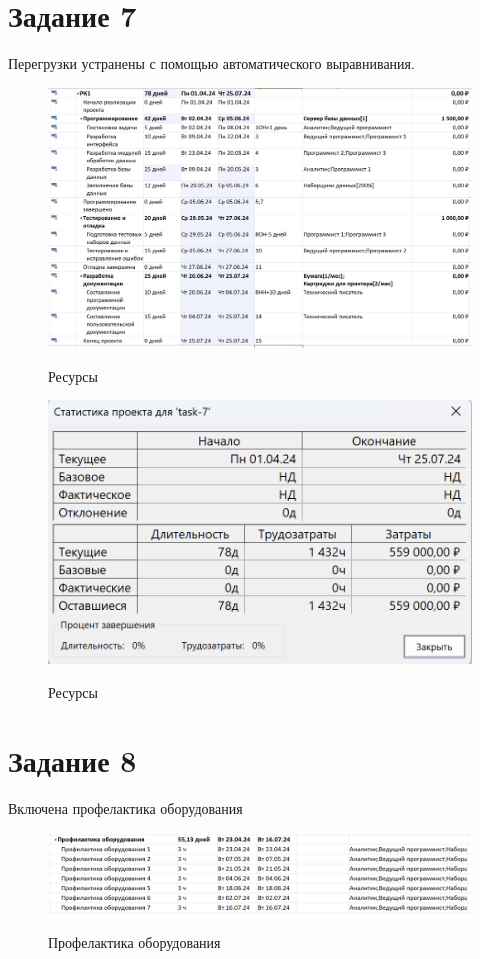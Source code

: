 \section{Задание 7}

Перегрузки устранены с помощью автоматического выравнивания.

\begin{figure}[ht!]
	\includegraphics[width=0.75\linewidth]{assets/images/7-tasks.png}
	\label{fig:r2}
	\caption{Ресурсы}
\end{figure}
\FloatBarrier

\begin{figure}[ht!]
	\includegraphics[width=0.75\linewidth]{assets/images/7-zatrat.png}
	\label{fig:r2}
	\caption{Ресурсы}
\end{figure}
\FloatBarrier


\section{Задание 8}

Включена профелактика оборудования

\begin{figure}[ht!]
	\includegraphics[width=0.75\linewidth]{assets/images/8.1-check.png}
	\label{fig:r2}
	\caption{Профелактика оборудования}
\end{figure}
\FloatBarrier

